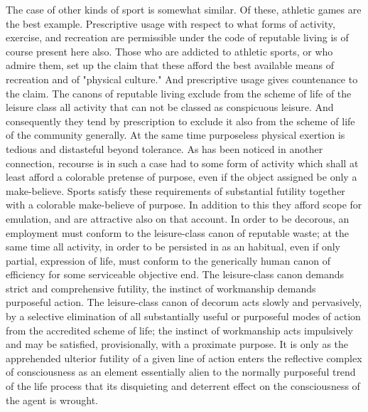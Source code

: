 \documentclass[12pt]{report}
\begin{document}
The case of other kinds of sport is somewhat similar. Of these, athletic
games are the best example. Prescriptive usage with respect to what
forms of activity, exercise, and recreation are permissible under the
code of reputable living is of course present here also. Those who are
addicted to athletic sports, or who admire them, set up the claim that
these afford the best available means of recreation and of "physical
culture." And prescriptive usage gives countenance to the claim. The
canons of reputable living exclude from the scheme of life of the
leisure class all activity that can not be classed as conspicuous
leisure. And consequently they tend by prescription to exclude it also
from the scheme of life of the community generally. At the same
time purposeless physical exertion is tedious and distasteful beyond
tolerance. As has been noticed in another connection, recourse is in
such a case had to some form of activity which shall at least afford
a colorable pretense of purpose, even if the object assigned be only a
make-believe. Sports satisfy these requirements of substantial futility
together with a colorable make-believe of purpose. In addition to
this they afford scope for emulation, and are attractive also on that
account. In order to be decorous, an employment must conform to the
leisure-class canon of reputable waste; at the same time all activity,
in order to be persisted in as an habitual, even if only partial,
expression of life, must conform to the generically human canon of
efficiency for some serviceable objective end. The leisure-class canon
demands strict and comprehensive futility, the instinct of workmanship
demands purposeful action. The leisure-class canon of decorum acts
slowly and pervasively, by a selective elimination of all substantially
useful or purposeful modes of action from the accredited scheme of
life; the instinct of workmanship acts impulsively and may be satisfied,
provisionally, with a proximate purpose. It is only as the apprehended
ulterior futility of a given line of action enters the reflective
complex of consciousness as an element essentially alien to the normally
purposeful trend of the life process that its disquieting and deterrent
effect on the consciousness of the agent is wrought.
\end{document}
